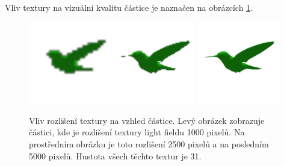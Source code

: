 Vliv textury na vizuální kvalitu částice je naznačen na obrázcích \ref{fig:texture_visual}. 
\begin{figure}[H]
	\centering
	\includegraphics[width=0.32\textwidth]{obrazky-figures/texture_l1.png}
	\includegraphics[width=0.32\textwidth]{obrazky-figures/texture_l2.png}
	\includegraphics[width=0.32\textwidth]{obrazky-figures/texture_l3.png}

	\caption{Vliv rozlišení textury na vzhled částice. Levý obrázek zobrazuje částici, kde je rozlišení textury light fieldu 1000 pixelů. Na prostředním obrázku je toto rozlišení 2500 pixelů a na posledním 5000 pixelů. Hustota všech těchto textur je 31.  }
	\label{fig:texture_visual}
\end{figure}

